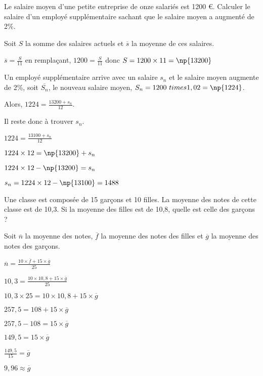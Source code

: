 
\begin{description}[leftmargin=*]
\item Le salaire moyen d'une petite entreprise de onze salariés est 1200 €. Calculer le salaire d'un employé supplémentaire sachant que le salaire moyen a augmenté de 2\%.

Soit $S$ la somme des salaires actuels et $\overline{s}$ la moyenne de ces salaires.

$\overline{s} = \frac{S}{11}$ en remplaçant,  $1200 = \frac{S}{11}$ donc $S = 1200 \times 11 = \np{13200}$

Un employé supplémentaire arrive avec un salaire $s_n$ et le salaire moyen augmente de 2\%, soit $\overline{S_n}$, le nouveau salaire moyen, $S_n = 1200 \ times 1,02 = \np {1224}$.

Alors, $1224 = \frac{13200+s_n}{12}$.

Il reste donc à trouver $s_n$.

$1224 = \frac{13100+s_n}{12}$

$1224 \times 12 = \np{13200}+s_n$

$1224 \times 12 - \np{13200}= s_n$


$s_n = 1224 \times 12 - \np{13100}= 1488$

\item Une classe est composée de 15 garçons et 10 filles. La moyenne des notes de cette classe est de 10,3. Si la moyenne des filles est de 10,8, quelle est celle des garçons ?

Soit $\overline{n}$ la moyenne des notes, $\overline{f}$ la moyenne des notes des filles et $\overline{g}$ la moyenne des notes des garçons.


$\overline{n} = \frac{10 \times \overline{f}+ 15 \times \overline{g}}{25}$

$10,3 = \frac{10 \times 10,8 + 15 \times \overline{g}}{25}$

$10,3 \times 25 = 10 \times 10,8 + 15 \times \overline{g}$

$257,5 = 108  + 15 \times \overline{g}$

$257,5 - 108  = 15 \times \overline{g}$

$149,5  = 15 \times \overline{g}$


$\frac{149,5}{15} = \overline{g}$

$9,96 \approx \overline{g}$



\end{description}